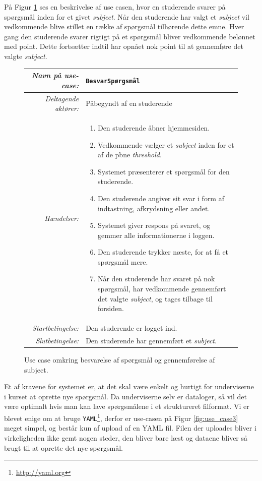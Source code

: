 \documentclass[11pt, a4paper]{article}
\begin{document}
På Figur \ref{fig:use_case2} ses en beskrivelse af use casen, hvor en studerende svarer på spørgsmål inden for et givet \emph{subject}. Når den studerende har valgt et \emph{subject} vil vedkommende blive stillet en række af spørgsmål tilhørende dette emne. Hver gang den studerende svarer rigtigt på et spørgsmål bliver vedkommende belønnet med point. Dette fortsætter indtil har opnået nok point til at gennemføre det valgte \emph{subject}.

\begin{figure}[h]
    \centering
    \begin{tabular}{r p{8cm}}
        \toprule
        \textit{Navn på use-case:} & \verb!BesvarSpørgsmål! \\
        \hline
        \textit{Deltagende aktører:} & Påbegyndt af en studerende \\
        \hline
        \textit{Hændelser:} & \begin{enumerate}[nolistsep]
            \item Den studerende åbner hjemmesiden.
            \item Vedkommende vælger et \emph{subject} inden for et af de pbne \emph{threshold}.
            \item Systemet præsenterer et spørgsmål for den studerende.
            \item Den studerende angiver sit svar i form af indtastning, afkrydsning eller andet.
            \item Systemet giver respons på svaret, og gemmer alle informationerne i loggen.
            \item Den studerende trykker næste, for at få et spørgsmål mere.
            \item Når den studerende har svaret på nok spørgsmål, har vedkommende gennemført det valgte \emph{subject}, og tages tilbage til forsiden.
        \end{enumerate}  \\
        \hline
        \textit{Startbetingelse:} & Den studerende er logget ind. \\
        \hline
        \textit{Slutbetingelse:} & Den studerende har gennemført et \emph{subject}. \\
        \bottomrule
    \end{tabular}
    \caption{Use case omkring besvarelse af spørgsmål og gennemførelse af subject.}
    \label{fig:use_case2}
\end{figure}

Et af kravene for systemet er, at det skal være enkelt og hurtigt for underviserne i kurset at oprette nye spørgsmål. Da underviserne selv er dataloger, så vil det være optimalt hvis man kan lave spørgsmålene i et struktureret filformat. Vi er blevet enige om at bruge \verb!YAML!\footnote{\url{http://yaml.org}}, derfor er use-casen på Figur \ref{fig:use_case3} meget simpel, og består kun af upload af en YAML fil. Filen der uploades bliver i virkeligheden ikke gemt nogen steder, den bliver bare læst og dataene bliver så brugt til at oprette det nye spørgsmål.
\end{document}
